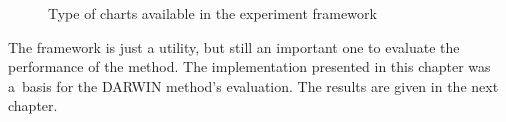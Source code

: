 \begin{figure}
  \centering
  \caption{Type of charts available in the experiment framework}
  \label{chart_examples2}
\end{figure}

The framework is just a utility, but still an important one to evaluate the
performance of the method. The implementation presented in this chapter was
a~basis for the DARWIN method's evaluation. The results are given in the next
chapter.
